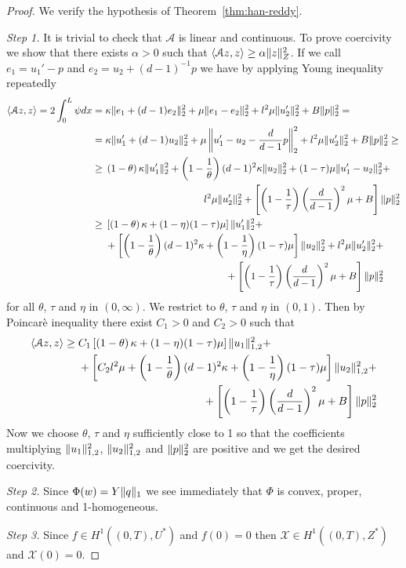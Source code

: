 \documentclass[a4paper,10pt,oneside]{amsbook}
\numberwithin{section}{chapter}
\numberwithin{equation}{chapter}
\theoremstyle{definition}
\DeclarePairedDelimiter{\norm}{\lVert}{\rVert}
\DeclarePairedDelimiter{\dual}{\langle}{\rangle}
\begin{document}
\begin{proof}
We verify the hypothesis of Theorem~\ref{thm:han-reddy}.

\emph{Step 1.} It is trivial to check that $\mathcal{A}$ is linear and continuous. To prove coercivity we show that there exists $\alpha>0$ such that $\dual{\mathcal{A}z,z}\ge\alpha\norm{z}_{Z}^2$. If we call $e_1=u_1'-p$ and $e_2=u_2+(d-1)^{-1}p$ we have by applying Young inequality repeatedly
\[
\begin{split}
\dual{\mathcal{A}z,z}=2\int_0^L\psi dx&=\kappa\norm{e_1+(d-1)e_2}_2^2+\mu\norm{e_1-e_2}_2^2+l^2\mu\norm{u_2'}_2^2+B\norm{p}_2^2=\\
&=\kappa\norm{u_1'+(d-1)u_2}_2^2+\mu\left\lVert u_1'-u_2-\frac{d}{d-1}p\right\rVert_2^2+l^2\mu\norm{u_2'}_2^2+B\norm{p}_2^2\ge\\
&\ge\begin{multlined}[t]
\left(1-\theta\right)\kappa\norm{u_1'}_2^2+\left(1-\frac{1}{\theta}\right)(d-1)^2\kappa\norm{u_2}_2^2+(1-\tau)\mu\norm{u_1'-u_2}_2^2+\\
l^2\mu\norm{u_2'}_2^2+\left[\left(1-\frac{1}{\tau}\right)\left(\frac{d}{d-1}\right)^2\mu+B\right]\norm{p}_2^2
\end{multlined}\\
&\ge
\begin{multlined}[t]
\left[\left(1-\theta\right)\kappa+(1-\eta)(1-\tau)\mu\right]\norm{u_1'}_2^2+\\
+\left[\left(1-\frac{1}{\theta}\right)(d-1)^2\kappa+\left(1-\frac{1}{\eta}\right)(1-\tau)\mu\right]\norm{u_2}_2^2+l^2\mu\norm{u_2'}_2^2+\\
+\left[\left(1-\frac{1}{\tau}\right)\left(\frac{d}{d-1}\right)^2\mu+B\right]\norm{p}_2^2
\end{multlined}
\end{split}
\]
for all $\theta$, $\tau$ and $\eta$ in $(0,\infty)$. We restrict to $\theta$, $\tau$ and $\eta$ in $(0,1)$. Then by Poincarè inequality there exist $C_1>0$ and $C_2>0$ such that
\[
\begin{split}
\dual{\mathcal{A}z,z}\ge
\begin{multlined}[t]
C_1\left[\left(1-\theta\right)\kappa+(1-\eta)(1-\tau)\mu\right]\norm{u_1}_{1,2}^2+\\
+\left[C_2l^2\mu+\left(1-\frac{1}{\theta}\right)(d-1)^2\kappa+\left(1-\frac{1}{\eta}\right)(1-\tau)\mu\right]\norm{u_2}_{1,2}^2+\\
+\left[\left(1-\frac{1}{\tau}\right)\left(\frac{d}{d-1}\right)^2\mu+B\right]\norm{p}_2^2
\end{multlined}
\end{split}
\]
Now we choose $\theta$, $\tau$ and $\eta$ sufficiently close to 1 so that the coefficients multiplying $\norm{u_1}_{1,2}^2$, $\norm{u_2}_{1,2}^2$ and $\norm{p}_2^2$ are positive and we get the desired coercivity.

\emph{Step 2.} Since $\Phi(w)=Y\norm{q}_1$ we see immediately that $\Phi$ is convex, proper, continuous and 1-homogeneous.

\emph{Step 3.} Since $f\in H^1((0,T),U^*)$ and $f(0)=0$ then $\mathcal{X}\in H^1((0,T),Z^*)$ and $\mathcal{X}(0)=0$.
\end{proof}
\end{document}
